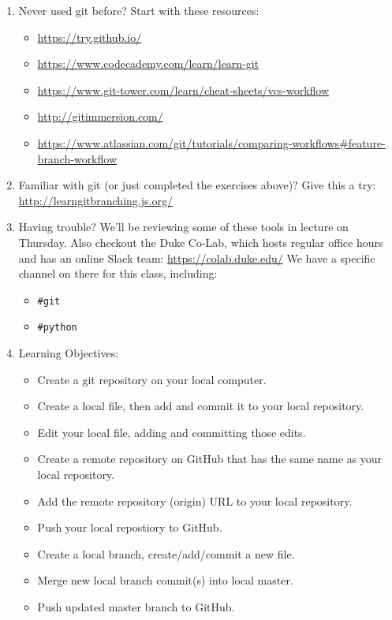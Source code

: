 \begin{enumerate}
\item Never used git before?  Start with these resources:
\begin{itemize}
    \item \url{https://try.github.io/}
    \item \url{https://www.codecademy.com/learn/learn-git}
    \item \url{https://www.git-tower.com/learn/cheat-sheets/vcs-workflow}
    \item \url{http://gitimmersion.com/}
    \item \url{https://www.atlassian.com/git/tutorials/comparing-workflows#feature-branch-workflow}
\end{itemize}

\item Familiar with git (or just completed the exercises above)?  Give this a
try: \url{http://learngitbranching.js.org/}

\item Having trouble?  We'll be reviewing some of these tools in lecture on
Thursday.  Also checkout the Duke Co-Lab, which hosts regular office hours and
has an online Slack team: \url{https://colab.duke.edu/}  We have a specific channel on there for this class, including:
\begin{itemize}
  \item \verb+#git+
  \item \verb+#python+
\end{itemize}

\item Learning Objectives:
\begin{itemize}
	\item Create a git repository on your local computer.
	\item Create a local file, then add and commit it to your local repository.
	\item Edit your local file, adding and committing those edits.
	\item Create a remote repository on GitHub that has the same name as your local repository.
	\item Add the remote repository (origin) URL to your local repository.
	\item Push your local repostiory to GitHub.
	\item Create a local branch, create/add/commit a new file.
	\item Merge new local branch commit(s) into local master.
	\item Push updated master branch to GitHub.
\end{itemize}

\end{enumerate}


